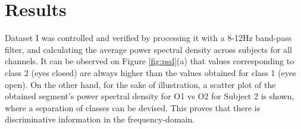 %

\section{Results}

Dataset I was controlled and verified by processing it with a 8-12Hz band-pass filter, and calculating the average power spectral density across subjects for all channels.  It can be observed on Figure \ref{fig:psd}(a)  that values corresponding to class 2 (eyes closed) are always higher than the values obtained for class 1 (eyes open). On the other hand, for the sake of illustration, a scatter plot of the obtained segment's power spectral density for O1 vs O2 for Subject 2 is shown, where a separation of classes can be devised.  This proves that there is discriminative information in the frequency-domain.



